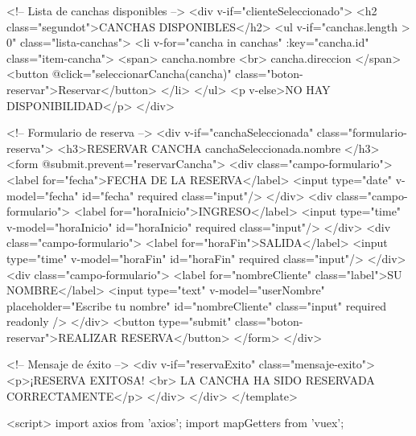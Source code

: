     <!-- Lista de canchas disponibles -->
    <div v-if="clienteSeleccionado">
      <h2 class="segundot">CANCHAS DISPONIBLES</h2>
      <ul v-if="canchas.length > 0" class="lista-canchas">
        <li v-for="cancha in canchas" :key="cancha.id" class="item-cancha">
          <span>{{ cancha.nombre }} <br> {{ cancha.direccion }}</span>
          <button @click="seleccionarCancha(cancha)" class="boton-reservar">Reservar</button>
        </li>
      </ul>
      <p v-else>NO HAY DISPONIBILIDAD</p>
    </div>

    <!-- Formulario de reserva -->
    <div v-if="canchaSeleccionada" class="formulario-reserva">
      <h3>RESERVAR CANCHA {{ canchaSeleccionada.nombre }}</h3>
      <form @submit.prevent="reservarCancha">
        <div class="campo-formulario">
          <label for="fecha">FECHA DE LA RESERVA</label>
          <input type="date" v-model="fecha" id="fecha" required class="input"/>
        </div>
        <div class="campo-formulario">
          <label for="horaInicio">INGRESO</label>
          <input type="time" v-model="horaInicio" id="horaInicio" required class="input"/>
        </div>
        <div class="campo-formulario">
          <label for="horaFin">SALIDA</label>
          <input type="time" v-model="horaFin" id="horaFin" required class="input"/>
        </div>
        <div class="campo-formulario">
          <label for="nombreCliente" class="label">SU NOMBRE</label>
          <input
            type="text"
            v-model="userNombre"
            placeholder="Escribe tu nombre"
            id="nombreCliente"
            class="input"
            required
            readonly
          />
        </div>
        <button type="submit" class="boton-reservar">REALIZAR RESERVA</button>
      </form>
    </div>

    <!-- Mensaje de éxito -->
    <div v-if="reservaExito" class="mensaje-exito">
      <p>¡RESERVA EXITOSA! <br> LA CANCHA HA SIDO RESERVADA CORRECTAMENTE</p>
    </div>
  </div>
</template>

<script>
import axios from 'axios';
import { mapGetters } from 'vuex';

